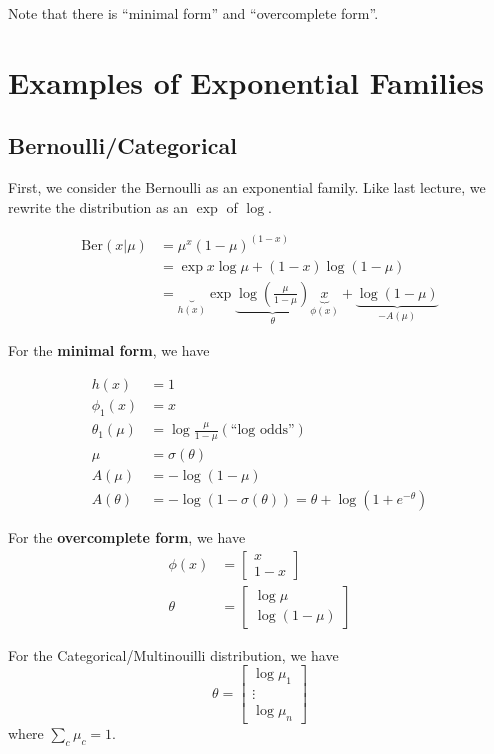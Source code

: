 \documentclass{article}
\begin{document}
\noindent Note that there is ``minimal form'' and ``overcomplete form''.

\section{Examples of Exponential Families}

\subsection{Bernoulli/Categorical}
First, we consider the Bernoulli as an exponential family. Like last lecture, we rewrite the distribution as an $\exp$ of $\log$.

\begin{align*}    
\text{Ber}(x | \mu) &= \mu^x(1-\mu)^{(1-x)} \\
 &= \exp{x\log \mu + (1-x)\log(1-\mu)} \\
 &= \underbrace{}_{h(x)}\exp{ \underbrace{\log\left(\frac{\mu }{1- \mu}\right)}_{\theta} \underbrace{x}_{\phi(x)} + \underbrace{\log (1- \mu)}_{-A(\mu)}}
\end{align*}

For the \textbf{minimal form}, we have 

\begin{align*}
    h(x) &= 1 \\
    \phi_1(x) &= x \\
    \theta_1(\mu) &= \log\frac{\mu}{1 - \mu} (\text{``log odds''}) \\
    \mu &= \sigma(\theta)\\
    A(\mu) &= -\log(1-\mu)\\
    A(\theta) &= -\log(1-\sigma(\theta)) = \theta + \log(1+ e^{-\theta})
\end{align*}

For the \textbf{overcomplete form}, we have 
\begin{align*}
    \phi(x) &= \begin{bmatrix} x \\ 1 - x \end{bmatrix}\\
    \theta &= \begin{bmatrix} \log \mu \\ \log (1- \mu) \end{bmatrix}
\end{align*}

For the Categorical/Multinouilli distribution, we have
$$\theta = \begin{bmatrix}
\log \mu_1 \\
\vdots \\
\log \mu_n
\end{bmatrix}
$$
where $\sum_{c} \mu_c = 1$.
\end{document}
